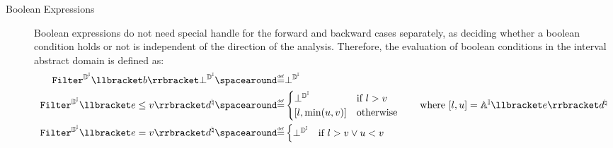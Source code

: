 \begin{description}
  \item[Boolean Expressions]
  Boolean expressions do not need special handle for the forward and backward cases separately, as deciding whether a boolean condition holds or not is independent of the direction of the analysis.
  Therefore, the evaluation of boolean conditions in the interval abstract domain is defined as:
  \begin{align*}
    \intervalabstractdomainfilter \semanticsof{\defbexp} \intervalabstractdomainbottom &\DefeQ \intervalabstractdomainbottom \\
    \intervalabstractdomainfilter \semanticsof{\defaexp \le \defvalue} \defabstractvalue &\DefeQ \begin{cases}
      \intervalabstractdomainbottom & \text{if } l > \defvalue \\
      \interval{l}{\min(u, \defvalue)} & \text{otherwise}
    \end{cases} \tag*{where $\interval{l}{u} = \intervalaexp \semanticsof{\defaexp} \defabstractvalue$} \\
    \intervalabstractdomainfilter \semanticsof{\defaexp = \defvalue} \defabstractvalue &\DefeQ \begin{cases}
      \intervalabstractdomainbottom & \text{if } l > \defvalue \lor u < \defvalue \\

\end{cases}
\end{align*}
\end{description}
